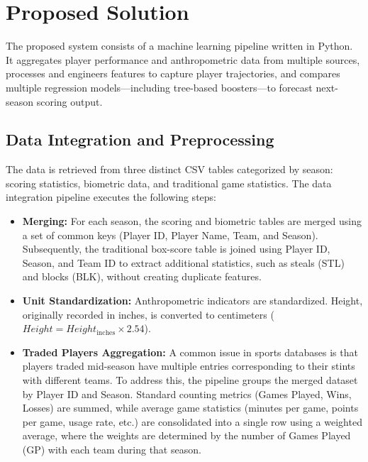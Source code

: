 \documentclass[conference]{IEEEtran}
\begin{document}
\section{Proposed Solution}


The proposed system consists of a machine learning pipeline written in Python. It aggregates player performance and anthropometric data from multiple sources, processes and engineers features to capture player trajectories, and compares multiple regression models—including tree-based boosters—to forecast next-season scoring output. 

\subsection{Data Integration and Preprocessing}
The data is retrieved from three distinct CSV tables categorized by season: scoring statistics, biometric data, and traditional game statistics. The data integration pipeline executes the following steps:
\begin{itemize}
    \item \textbf{Merging:} For each season, the scoring and biometric tables are merged using a set of common keys (Player ID, Player Name, Team, and Season). Subsequently, the traditional box-score table is joined using Player ID, Season, and Team ID to extract additional statistics, such as steals (STL) and blocks (BLK), without creating duplicate features.
    \item \textbf{Unit Standardization:} Anthropometric indicators are standardized. Height, originally recorded in inches, is converted to centimeters ($Height = Height_{\text{inches}} \times 2.54$).
    \item \textbf{Traded Players Aggregation:} A common issue in sports databases is that players traded mid-season have multiple entries corresponding to their stints with different teams. To address this, the pipeline groups the merged dataset by Player ID and Season. Standard counting metrics (Games Played, Wins, Losses) are summed, while average game statistics (minutes per game, points per game, usage rate, etc.) are consolidated into a single row using a weighted average, where the weights are determined by the number of Games Played (GP) with each team during that season.
\end{itemize}
\end{document}
